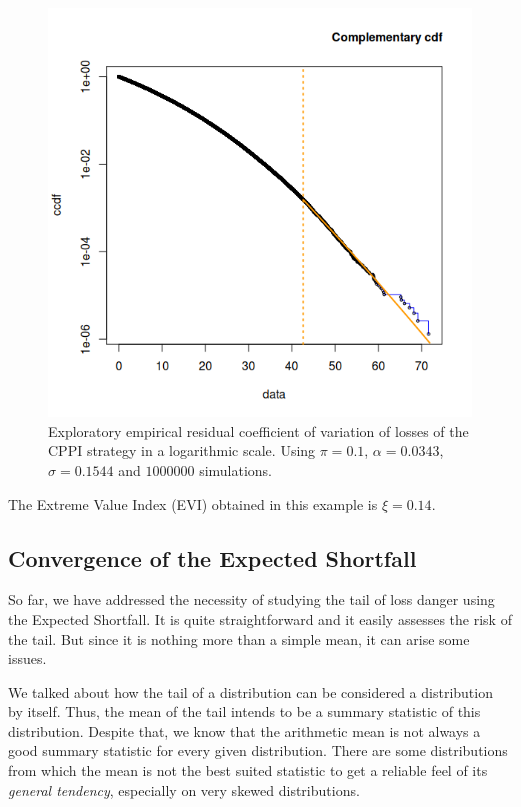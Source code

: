 \begin{figure}[H]
    \centering
    \includegraphics[scale=0.75]{images/cppi-ccdf-autothresh.png}
    \caption{Exploratory empirical residual coefficient of variation of losses of the CPPI strategy in a logarithmic scale. Using $\pi = 0.1$, $\alpha = 0.0343$, $\sigma = 0.1544$ and $1000000$ simulations.}
    \label{fig:ololol}
\end{figure}

The Extreme Value Index (EVI) obtained in this example is $\xi = 0.14$.







\subsection{Convergence of the Expected Shortfall}

So far, we have addressed the necessity of studying the tail of loss danger using the Expected Shortfall. It is quite straightforward and it easily assesses the risk of the tail. But since it is nothing more than a simple mean, it can arise some issues. 

We talked about how the tail of a distribution can be considered a distribution by itself. Thus, the mean of the tail intends to be a summary statistic of this distribution. Despite that, we know that the arithmetic mean is not always a good summary statistic for every given distribution. There are some distributions from which the mean is not the best suited statistic to get a reliable feel of its \emph{general tendency}, especially on very skewed distributions.

